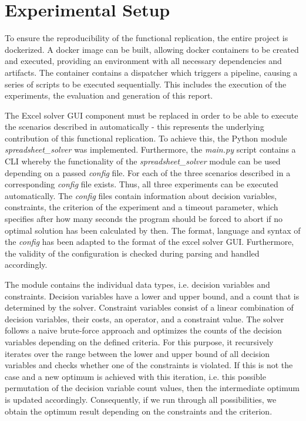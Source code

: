 \documentclass[sigconf, nonacm]{acmart}
\begin{document}
\section{Experimental Setup}
To ensure the reproducibility of the functional replication, the entire project is dockerized. A docker image can be built, allowing docker containers to be created and executed, providing an environment with all necessary dependencies and artifacts. The container contains a dispatcher which triggers a pipeline, causing a series of scripts to be executed sequentially. This includes the execution of the experiments, the evaluation and generation of this report.


The Excel solver GUI component must be replaced in order to be able to execute the scenarios described in \cite{Milton2009} automatically - this represents the underlying contribution of this functional replication. To achieve this, the Python module \textit{spreadsheet\_solver} was implemented. Furthermore, the \textit{main.py} script contains a CLI whereby the functionality of the \textit{spreadsheet\_solver} module can be used depending on a passed \textit{config} file. For each of the three scenarios described in \cite{Milton2009} a corresponding \textit{config} file exists. Thus, all three experiments can be executed automatically. The \textit{config} files contain information about decision variables, constraints, the criterion of the experiment and a timeout parameter, which specifies after how many seconds the program should be forced to abort if no optimal solution has been calculated by then. The format, language and syntax of the \textit{config} has been adapted to the format of the excel solver GUI. Furthermore, the validity of the configuration is checked during parsing and handled accordingly.


The module contains the individual data types, i.e. decision variables and constraints. Decision variables have a lower and upper bound, and a count that is determined by the solver. Constraint variables consist of a linear combination of decision variables, their costs, an operator, and a constraint value. The solver follows a naive brute-force approach and optimizes the counts of the decision variables depending on the defined criteria. For this purpose, it recursively iterates over the range between the lower and upper bound of all decision variables and checks whether one of the constraints is violated. If this is not the case and a new optimum is achieved with this iteration, i.e. this possible permutation of the decision variable count values, then the intermediate optimum is updated accordingly. Consequently, if we run through all possibilities, we obtain the optimum result depending on the constraints and the criterion.
\end{document}
